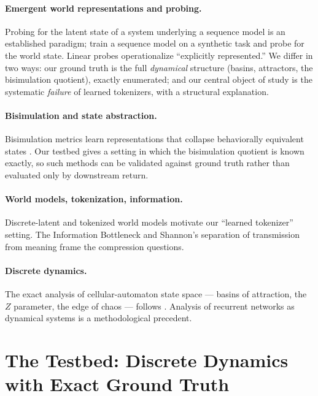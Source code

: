 \documentclass[11pt]{article}
\begin{document}
\paragraph{Emergent world representations and probing.}
Probing for the latent state of a system underlying a sequence model is an
established paradigm; \citet{li2023emergent} train a sequence model on a
synthetic task and probe for the world state. Linear probes
\citep{alain2016probes} operationalize ``explicitly represented.'' We differ
in two ways: our ground truth is the full \emph{dynamical} structure (basins,
attractors, the bisimulation quotient), exactly enumerated; and our central
object of study is the systematic \emph{failure} of learned tokenizers, with a
structural explanation.

\paragraph{Bisimulation and state abstraction.}
Bisimulation metrics learn representations that collapse behaviorally
equivalent states \citep{zhang2021dbc,castro2021mico}. Our testbed gives a
setting in which the bisimulation quotient is known exactly, so such methods
can be validated against ground truth rather than evaluated only by downstream
return.

\paragraph{World models, tokenization, information.}
Discrete-latent and tokenized world models \citep{vandenoord2017vqvae,
hafner2023dreamerv3} motivate our ``learned tokenizer'' setting. The
Information Bottleneck \citep{tishby1999ib} and Shannon's separation of
transmission from meaning \citep{shannon1948} frame the compression questions.

\paragraph{Discrete dynamics.}
The exact analysis of cellular-automaton state space --- basins of attraction,
the $Z$ parameter, the edge of chaos --- follows \citet{wuensche1999z}.
Analysis of recurrent networks as dynamical systems
\citep{sussillo2013blackbox} is a methodological precedent.


\section{The Testbed: Discrete Dynamics with Exact Ground Truth}
\label{sec:testbed}
\end{document}
